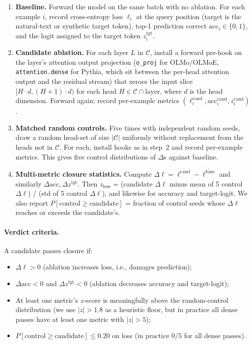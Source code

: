 \documentclass[11pt]{article}
\begin{document}
\begin{enumerate}
\item \textbf{Baseline.} Forward the model on the same batch with no
  ablation. For each example $i$, record cross-entropy loss $\ell_i$ at the
  query position (target is the natural-text or synthetic target token),
  top-1 prediction correct $\text{acc}_i \in \{0,1\}$, and the logit
  assigned to the target token $z_i^{\text{tgt}}$.

\item \textbf{Candidate ablation.} For each layer $L$ in $\mathcal{C}$,
  install a forward pre-hook on the layer's attention output projection
  (\texttt{o\_proj} for OLMo/OLMoE, \texttt{attention.dense} for Pythia,
  which sit between the per-head attention output and the residual stream)
  that zeroes the input slice $[H \cdot d, (H+1)\cdot d)$ for each head
  $H \in \mathcal{C} \cap \text{layer}$, where $d$ is the head dimension.
  Forward again; record per-example metrics
  $(\ell_i^{\text{cand}}, \text{acc}_i^{\text{cand}}, z_i^{\text{cand}})$.

\item \textbf{Matched random controls.} Five times with independent random
  seeds, draw a random head-set of size $|\mathcal{C}|$ uniformly without
  replacement from the heads not in $\mathcal{C}$. For each, install hooks
  as in step~2 and record per-example metrics. This gives five control
  distributions of $\Delta$s against baseline.

\item \textbf{Multi-metric closure statistics.} Compute
  $\Delta \ell = \overline{\ell^{\text{cand}}} - \overline{\ell^{\text{base}}}$
  and similarly $\Delta\text{acc}, \Delta z^{\text{tgt}}$. Then
  $z_{\text{loss}}$ = (candidate $\Delta \ell$ minus mean of 5 control
  $\Delta\ell$) / (std of 5 control $\Delta\ell$), and likewise for
  accuracy and target-logit. We also report
  $P[\text{control} \geq \text{candidate}]$ = fraction of control seeds
  whose $\Delta \ell$ reaches or exceeds the candidate's.
\end{enumerate}

\paragraph{Verdict criteria.} A candidate passes closure if:
\begin{itemize}
\item $\Delta \ell > 0$ (ablation increases loss, i.e., damages
  prediction);
\item $\Delta \text{acc} < 0$ and $\Delta z^{\text{tgt}} < 0$ (ablation
  decreases accuracy and target-logit);
\item At least one metric's $z$-score is meaningfully above the
  random-control distribution (we use $|z| > 1.8$ as a heuristic floor, but
  in practice all dense passes have at least one metric with $|z| > 5$);
\item $P[\text{control} \geq \text{candidate}] \leq 0.20$ on loss (in
  practice $0/5$ for all dense passes).
\end{itemize}
\end{document}
